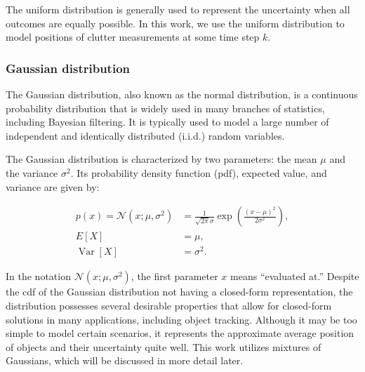 The uniform distribution is generally used to represent the uncertainty when
all outcomes are equally possible. In this work, we use the uniform distribution
to model positions of clutter measurements at some time step $k$.

\subsubsection{Gaussian distribution}\label{sec:gauss}

The Gaussian distribution, also known as the normal distribution, is a 
continuous probability distribution that is widely used in many branches
of statistics, including Bayesian filtering. It is typically used to model
a large number of independent and identically distributed (i.i.d.) random variables.

The Gaussian distribution is characterized by two parameters: the mean 
$\mu$ and the variance $\sigma^2$. Its probability density function (pdf), 
expected value, and variance are given by:

$$
\begin{aligned}
    p(x)
        =\mathscr{N}\left(x ; \mu, \sigma^2\right)
        &=\frac{1}{\sqrt{2 \pi} \sigma} \exp \left(\frac{(x-\mu)^2}{2 \sigma^2}\right), \\
    E[X] &= \mu, \\
    \operatorname{Var}[X] &= \sigma^2.
\end{aligned}
$$

In the notation $\mathscr{N}\left(x ; \mu, \sigma^2\right)$, the first 
parameter $x$ means ``evaluated at.''
Despite the cdf of the Gaussian distribution not having a closed-form 
representation, the distribution possesses several desirable properties that 
allow for closed-form solutions in many applications, including object 
tracking. Although it may be too simple to model certain scenarios, it 
represents the approximate average position of objects and their uncertainty 
quite well. This work utilizes mixtures of Gaussians, which will be discussed 
in more detail later.
